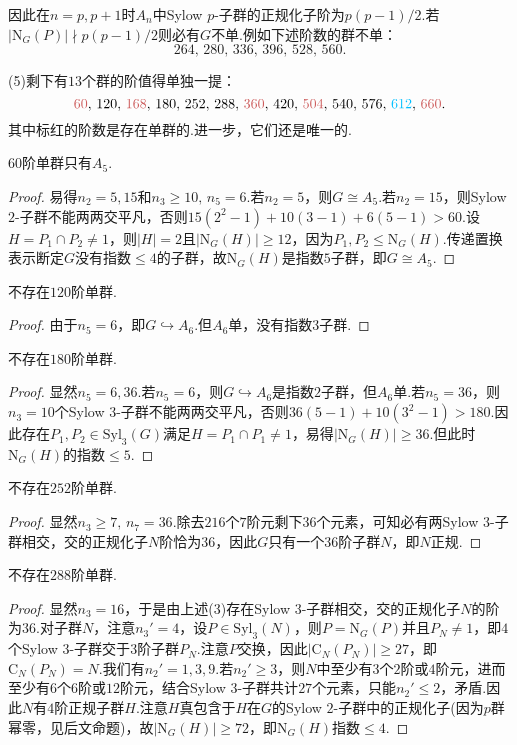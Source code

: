 因此在$n=p,p+1$时$A_n$中Sylow $p$-子群的正规化子阶为$p(p-1)/2$.若$|\mathrm{N}_G(P)|\nmid p(p-1)/2$则必有$G$不单.例如下述阶数的群不单：
\[
	264,\,280,\,336,\,396,\,528,\,560.
\]

(5)剩下有$13$个群的阶值得单独一提：
\[
	{\color{IndianRed}60},\,120,\,{\color{IndianRed}168},\,180,\,252,\,288,\,{\color{IndianRed}360},\,420,\,{\color{IndianRed}504},\,540,\,576,\,{\color{DeepSkyBlue}612},\,{\color{IndianRed}660}.
\]
其中标红的阶数是存在单群的.进一步，它们还是唯一的.
\begin{prop}
	$60$阶单群只有$A_5$.
\end{prop}
\begin{proof}
	易得$n_2=5,15$和$n_3\ge 10,\,n_5=6$.若$n_2=5$，则$G\cong A_5$.若$n_2=15$，则Sylow $2$-子群不能两两交平凡，否则$15(2^2-1)+10(3-1)+6(5-1)>60$.设$H=P_1\cap P_2\ne 1$，则$|H|=2$且$|\mathrm{N}_G(H)|\ge 12$，因为$P_1,P_2\le\mathrm{N}_G(H)$.传递置换表示断定$G$没有指数$\le 4$的子群，故$\mathrm{N}_G(H)$是指数$5$子群，即$G\cong A_5$.
\end{proof}
\begin{lemma}
	不存在$120$阶单群.
\end{lemma}
\begin{proof}
	由于$n_5=6$，即$G\hookrightarrow A_6$.但$A_6$单，没有指数$3$子群.
\end{proof}
\begin{lemma}
	不存在$180$阶单群.
\end{lemma}
\begin{proof}
	显然$n_5=6,36$.若$n_5=6$，则$G\hookrightarrow A_6$是指数$2$子群，但$A_6$单.若$n_5=36$，则$n_3=10$个Sylow $3$-子群不能两两交平凡，否则$36(5-1)+10(3^2-1)>180$.因此存在$P_1,P_2\in\mathrm{Syl}_3(G)$满足$H=P_1\cap P_1\ne 1$，易得$|\mathrm{N}_G(H)|\ge 36$.但此时$\mathrm{N}_G(H)$的指数$\le 5$.
\end{proof}
\begin{lemma}
	不存在$252$阶单群.
\end{lemma}
\begin{proof}
	显然$n_3\ge 7,\,n_7=36$.除去$216$个$7$阶元剩下$36$个元素，可知必有两Sylow $3$-子群相交，交的正规化子$N$阶恰为$36$，因此$G$只有一个$36$阶子群$N$，即$N$正规.
\end{proof}
\begin{lemma}
	不存在$288$阶单群.
\end{lemma}
\begin{proof}
	显然$n_3=16$，于是由上述(3)存在Sylow $3$-子群相交，交的正规化子$N$的阶为$36$.对子群$N$，注意$n_3'=4$，设$P\in\mathrm{Syl}_3(N)$，则$P=\mathrm{N}_G(P)$并且$P_N\ne 1$，即$4$个Sylow $3$-子群交于$3$阶子群$P_N$.注意$P$交换，因此$|\mathrm{C}_N(P_N)|\ge 27$，即$\mathrm{C}_N(P_N)=N$.我们有$n_2'=1,3,9$.若$n_2'\ge 3$，则$N$中至少有$3$个$2$阶或$4$阶元，进而至少有$6$个$6$阶或$12$阶元，结合Sylow $3$-子群共计$27$个元素，只能$n_2'\le 2$，矛盾.因此$N$有$4$阶正规子群$H$.注意$H$真包含于$H$在$G$的Sylow $2$-子群中的正规化子(因为$p$群幂零，见后文命题)，故$|\mathrm{N}_G(H)|\ge 72$，即$\mathrm{N}_G(H)$指数$\le 4$.
\end{proof}
